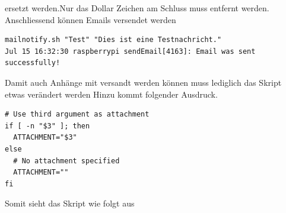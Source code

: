 \documentclass[11pt,a4paper]{article} %
\begin{document}
ersetzt werden.Nur das Dollar Zeichen am Schluss muss entfernt werden. Anschliessend k\"onnen Emails versendet werden
\begin{frame}

\begin{lstlisting}
mailnotify.sh "Test" "Dies ist eine Testnachricht."
Jul 15 16:32:30 raspberrypi sendEmail[4163]: Email was sent successfully!

\end{lstlisting}
\end{frame}
\par
Damit auch Anh\"ange mit versandt werden k\"onnen muss lediglich das Skript etwas ver\"andert werden
Hinzu kommt folgender Ausdruck. \cite{berry9}
\begin{frame}

\begin{lstlisting}
# Use third argument as attachment
if [ -n "$3" ]; then
  ATTACHMENT="$3"
else
  # No attachment specified
  ATTACHMENT=""
fi

\end{lstlisting}
\end{frame}
\newpage
Somit sieht das Skript wie folgt aus \cite{berry8}
\end{document}

